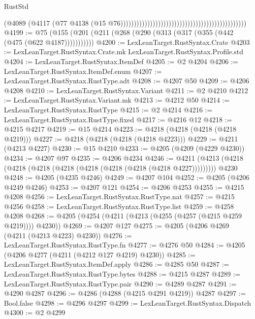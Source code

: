 \begin{lexlean}{RustStd}
\begin{coremodule}
                                                                                          (@4089
                                                                                            (@4117
                                                                                              (@77
                                                                                                @4138
                                                                                                (@15
                                                                                                  @76)))))))))))))))))))))))))))))))))))))))))))))))
@4199 := @75 (@155 (@201 (@211 (@268 (@290 (@313 (@317 (@355 (@442 (@475 (@622 @4187)))))))))))
@4200 := LexLeanTarget.RustSyntax.Crate
@4203 := LexLeanTarget.RustSyntax.Crate.mk LexLeanTarget.RustSyntax.Profile.std
@4204 := LexLeanTarget.RustSyntax.ItemDef
@4205 := @2 @4204
@4206 := LexLeanTarget.RustSyntax.ItemDef.enum
@4207 := LexLeanTarget.RustSyntax.RustType.adt
@4208 := @4207 @50
@4209 := @4206 @4208
@4210 := LexLeanTarget.RustSyntax.Variant
@4211 := @2 @4210
@4212 := LexLeanTarget.RustSyntax.Variant.mk
@4213 := @4212 @50
@4214 := LexLeanTarget.RustSyntax.RustType
@4215 := @2 @4214
@4216 := LexLeanTarget.RustSyntax.RustType.fixed
@4217 := @4216 @12
@4218 := @4215 @4217
@4219 := @15 @4214
@4223 := @4218 (@4218 (@4218 (@4218 @4219)))
@4227 := @4218 (@4218 (@4218 (@4218 @4223)))
@4229 := @4211 (@4213 @4227)
@4230 := @15 @4210
@4233 := @4205 (@4209 (@4229 @4230))
@4234 := @4207 @97
@4235 := @4206 @4234
@4246 := @4211 (@4213 (@4218 (@4218 (@4218 (@4218 (@4218 (@4218 (@4218 (@4218 @4227))))))))) @4230
@4248 := @4205 (@4235 @4246)
@4249 := @4207 @104
@4252 := @4205 (@4206 @4249 @4246)
@4253 := @4207 @121
@4254 := @4206 @4253
@4255 := @4215 @4208
@4256 := LexLeanTarget.RustSyntax.RustType.nat
@4257 := @4215 @4256
@4258 := LexLeanTarget.RustSyntax.RustType.list
@4259 := @4258 @4208
@4268 := @4205 (@4254 (@4211 (@4213 (@4255 (@4257 (@4215 @4259 @4219)))) @4230))
@4269 := @4207 @127
@4275 := @4205 (@4206 @4269 (@4211 (@4213 @4223) @4230))
@4276 := LexLeanTarget.RustSyntax.RustType.fn
@4277 := @4276 @50
@4284 := @4205 (@4206 @4277 (@4211 (@4212 @127 @4219) @4230))
@4285 := LexLeanTarget.RustSyntax.ItemDef.apply
@4286 := @4285 @50
@4287 := LexLeanTarget.RustSyntax.RustType.bytes
@4288 := @4215 @4287
@4289 := LexLeanTarget.RustSyntax.RustType.pair
@4290 := @4289 @4287
@4291 := @4290 @4287
@4296 := @4286 (@4288 (@4215 @4291 @4219)) @4287
@4297 := Bool.false
@4298 := @4296 @4297
@4299 := LexLeanTarget.RustSyntax.Dispatch
@4300 := @2 @4299

\end{coremodule}
\end{lexlean}
